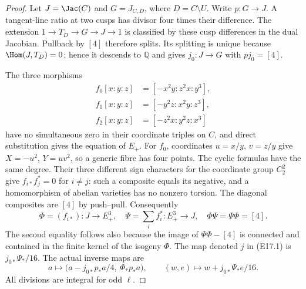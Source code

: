 \begin{proof}
Let $J=\Jac(C)$ and $G=J_{C,D}$, where $D=C\setminus U$.
Write $p:G\to J$. A tangent-line ratio at two cusps has
divisor four times their difference. The extension
$1\to T_D\to G\to J\to1$ is classified by these cusp
differences in the dual Jacobian. Pullback by $[4]$
therefore splits. Its splitting is unique because
$\Hom(J,T_D)=0$; hence it descends to $\mathbb Q$ and
gives $j_0:J\to G$ with $pj_0=[4]$.

The three morphisms
\[
 \begin{aligned}
 f_0[x:y:z]&=[-x^2y:z^2x:y^3],\\
 f_1[x:y:z]&=[-y^2z:x^2y:z^3],\\
 f_2[x:y:z]&=[-z^2x:y^2z:x^3]
 \end{aligned}
 \tag{E17.2}
\]
have no simultaneous zero in their coordinate triples
on $C$, and direct substitution gives the equation of
$E_+$. For $f_0$, coordinates $u=x/y$, $v=z/y$ give
$X=-u^2$, $Y=uv^2$, so a generic fibre has four points.
The cyclic formulas have the same degree. Their three
different sign characters for the coordinate group
$C_2^2$ give $f_{i*}f_j^*=0$ for $i\ne j$: such a
composite equals its negative, and a homomorphism of
abelian varieties has no nonzero torsion. The diagonal
composites are $[4]$ by push--pull. Consequently
\[
 \Phi=(f_{i*}):J\to E_+^3,\quad
 \Psi=\sum_i f_i^*:E_+^3\to J,\quad
 \Phi\Psi=\Psi\Phi=[4].
\]
The second equality follows also because the image of
$\Psi\Phi-[4]$ is connected and contained in the finite
kernel of the isogeny $\Phi$. The map denoted $j$ in
(E17.1) is $j_{0*}\Psi_*/16$. The actual inverse maps are
\[
 a\longmapsto
 \bigl(a-j_{0*}p_*a/4,\ \Phi_*p_*a\bigr),
 \qquad
 (w,e)\longmapsto w+j_{0*}\Psi_*e/16.
 \tag{E17.3}
\]
All divisions are integral for odd $\ell$.


\end{proof}
